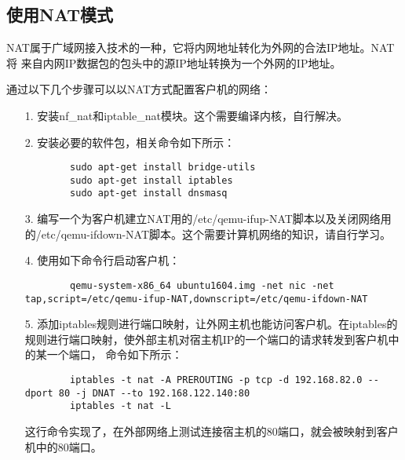 \documentclass[a4paper,left=2.5cm,right=2.5cm,11pt]{article}
\begin{document}
\subsection{使用NAT模式}
	NAT属于广域网接入技术的一种，它将内网地址转化为外网的合法IP地址。NAT将 来自内网IP数据包的包头中的源IP地址转换为一个外网的IP地址。\par
	通过以下几个步骤可以以NAT方式配置客户机的网络：
	\begin{itemize}
		\item[1.] 安装nf\_nat和iptable\_nat模块。这个需要编译内核，自行解决。
		\item[2.] 安装必要的软件包，相关命令如下所示：
		\begin{lstlisting}
		sudo apt-get install bridge-utils
		sudo apt-get install iptables
		sudo apt-get install dnsmasq
		\end{lstlisting}

		\item[3.] 编写一个为客户机建立NAT用的/etc/qemu-ifup-NAT脚本以及关闭网络用的/etc/qemu-ifdown-NAT脚本。这个需要计算机网络的知识，请自行学习。
		\item[4.] 使用如下命令行启动客户机：
		\begin{lstlisting}
		qemu-system-x86_64 ubuntu1604.img -net nic -net tap,script=/etc/qemu-ifup-NAT,downscript=/etc/qemu-ifdown-NAT
		\end{lstlisting}

		\item[5.] 添加iptables规则进行端口映射，让外网主机也能访问客户机。在iptables的规则进行端口映射，使外部主机对宿主机IP的一个端口的请求转发到客户机中的某一个端口，
		命令如下所示：
		\begin{lstlisting}
		iptables -t nat -A PREROUTING -p tcp -d 192.168.82.0 --dport 80 -j DNAT --to 192.168.122.140:80
		iptables -t nat -L
		\end{lstlisting}

		这行命令实现了，在外部网络上测试连接宿主机的80端口，就会被映射到客户机中的80端口。

	\end{itemize}
\end{document}
